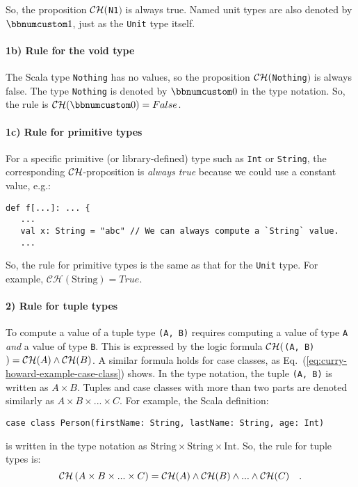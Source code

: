 \noindent So, the proposition ${\cal CH}($\lstinline!N1!$)$ is
always true. Named unit types are also denoted by $\bbnum 1$, just
as the \lstinline!Unit! type itself.

\paragraph{1b) Rule for the void type}

The Scala type \lstinline!Nothing! has no values, so the proposition
${\cal CH}($\lstinline!Nothing!$)$ is always false. The type \lstinline!Nothing!
is denoted by $\bbnum 0$ in the type notation. So, the rule is $\mathcal{CH}(\bbnum 0)=False$.

\paragraph{1c) Rule for primitive types}

For a specific primitive (or library-defined) type such as \lstinline!Int!
or \lstinline!String!, the corresponding ${\cal CH}$-proposition
is \emph{always true} because we could use a constant value, e.g.:
\begin{lstlisting}
def f[...]: ... {
   ...
   val x: String = "abc" // We can always compute a `String` value.
   ...
\end{lstlisting}
So, the rule for primitive types is the same as that for the \lstinline!Unit!
type. For example, $\mathcal{CH}(\text{String})=True$.

\paragraph{2) Rule for tuple types}

To compute a value of a tuple type \lstinline!(A, B)! requires computing
a value of type \lstinline!A! \emph{and} a value of type \lstinline!B!.
This is expressed by the logic formula ${\cal CH}($\lstinline!(A, B)!$)={\cal CH}(A)\wedge{\cal CH}(B)$.
A similar formula holds for case classes, as Eq.~(\ref{eq:curry-howard-example-case-class})
shows. In the type notation, the tuple \lstinline!(A, B)! is written
as $A\times B$. Tuples and case classes with more than two parts
are denoted similarly as $A\times B\times...\times C$. For example,
the Scala definition:
\begin{lstlisting}
case class Person(firstName: String, lastName: String, age: Int)
\end{lstlisting}
is written in the type notation as $\text{String}\times\text{String}\times\text{Int}$.
So, the rule for tuple types is:
\[
{\cal CH}\left(A\times B\times...\times C\right)={\cal CH}(A)\wedge{\cal CH}(B)\wedge...\wedge{\cal CH}(C)\quad.
\]


